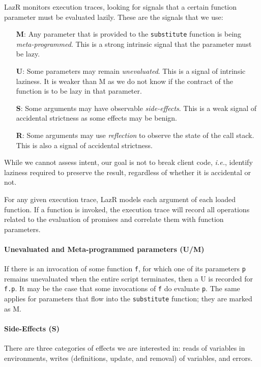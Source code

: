 \documentclass[review,nonacm,screen,acmsmall,anonymous=true]{acmart}
\renewcommand{\c}[1]{\lstinline |#1|\xspace}
\newcommand{\lazr}{{\sf LazR}\xspace}
\newcommand{\ie}{\emph{i.e.},\xspace}
\begin{document}
\lazr monitors execution traces, looking for signals that a certain function
parameter must be evaluated lazily. These are the signals that we use:
\begin{itemize}
\item[{\bf M}:] Any parameter that is provided to the \c{substitute} function is
  being \emph{meta-programmed}. This is a strong intrinsic signal that the parameter
  must be lazy.
\item[{\bf U}:] Some parameters may remain \emph{unevaluated}. This is a signal
  of intrinsic laziness. It is weaker than M as we do not know if the contract
  of the function is to be lazy in that parameter.
\item [{\bf S}:] Some arguments may have observable \emph{side-effects}. This is
  a weak signal of accidental strictness as some effects may be benign.
\item[{\bf R}:] Some arguments may use \emph{reflection} to observe the state of
  the call stack. This is also a signal of accidental strictness.
\end{itemize}
\noindent
While we cannot assess intent, our goal is not to break client code, \ie
identify laziness required to preserve the result, regardless of whether it is
accidental or not.

For any given execution trace, \lazr models each argument of each loaded
function. If a function is invoked, the execution trace will record all
operations related to the evaluation of promises and correlate them with
function parameters.

\paragraph{Unevaluated and Meta-programmed parameters (U/M)}
If there is an invocation of some function \c f, for which one of its parameters
\c p remains unevaluated when the entire script terminates, then a U is recorded
for \c{f.p}. It may be the case that some invocations of \c f do evaluate \c p.
The same applies for parameters that flow into the \c{substitute} function; they
are marked as M.

\paragraph{Side-Effects (S)}
There are three categories of effects we are interested in: reads of variables
in environments, writes (definitions, update, and removal) of variables, and
errors.
\end{document}
